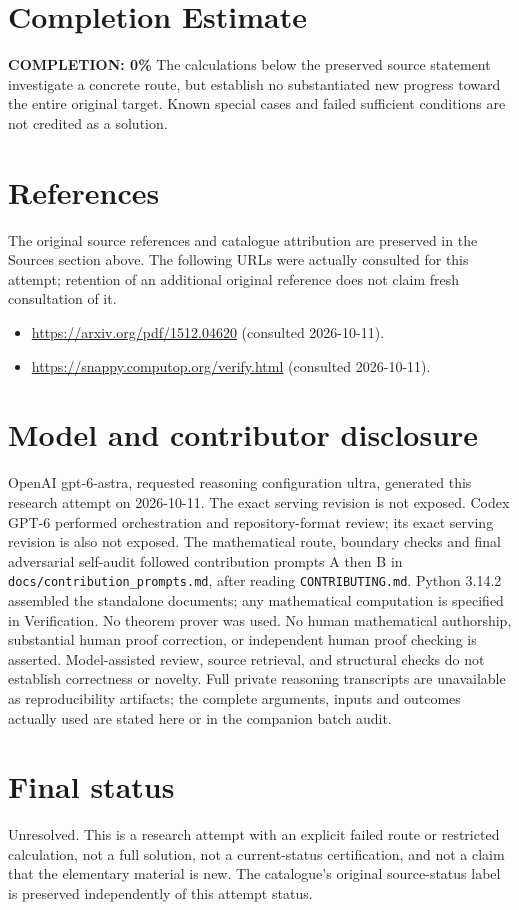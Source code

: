 \documentclass[11pt]{article}
\begin{document}
\section{Completion Estimate}
\noindent\textbf{COMPLETION: 0\%}
The calculations below the preserved source statement investigate a concrete route,
but establish no substantiated new progress toward the entire original target.
Known special cases and failed sufficient conditions are not credited as a solution.
\section{References}
The original source references and catalogue attribution are preserved in the
Sources section above. The following URLs were actually consulted for this attempt;
retention of an additional original reference does not claim fresh consultation of it.
\begin{itemize}
\item \url{https://arxiv.org/pdf/1512.04620} (consulted 2026-10-11). 
\item \url{https://snappy.computop.org/verify.html} (consulted 2026-10-11). 
\end{itemize}
\section{Model and contributor disclosure}
OpenAI gpt-6-astra, requested reasoning configuration ultra, generated this research
attempt on 2026-10-11. The exact serving revision is not exposed. Codex GPT-6
performed orchestration and repository-format review; its exact serving revision
is also not exposed. The mathematical route, boundary checks and final adversarial
self-audit followed contribution prompts A then B in
\texttt{docs/contribution\_prompts.md}, after reading \texttt{CONTRIBUTING.md}.
Python 3.14.2 assembled the standalone documents; any mathematical computation is
specified in Verification. No theorem prover was used. No human mathematical
authorship, substantial human proof correction, or independent human proof checking
is asserted. Model-assisted review, source retrieval, and structural checks do not
establish correctness or novelty. Full private reasoning transcripts are unavailable
as reproducibility artifacts; the complete arguments, inputs and outcomes actually
used are stated here or in the companion batch audit.
\section{Final status}
Unresolved. This is a research attempt with an explicit failed route or restricted
calculation, not a full solution, not a current-status certification, and not a claim
that the elementary material is new. The catalogue's original source-status label
is preserved independently of this attempt status.
\end{document}
